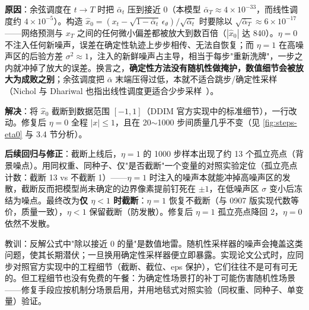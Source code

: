 \documentclass[11pt]{article}
\begin{document}
\textbf{原因}：余弦调度在 $t \to T$ 时把 $\bar{\alpha}_t$ 压到接近 0（本模型 $\bar{\alpha}_T \approx 4\times10^{-33}$，而线性调度约 $4\times10^{-5}$）。构造 $\hat{x}_0 = (x_t - \sqrt{1-\bar{\alpha}_t}\,\epsilon_\theta)/\sqrt{\bar{\alpha}_t}$ 时要除以 $\sqrt{\bar{\alpha}_T} \approx 6\times10^{-17}$——网络预测与 $x_T$ 之间的任何微小偏差都被放大到数百倍（$|\hat{x}_0|$ 达 840）。$\eta=0$ 不注入任何新噪声，误差在确定性轨迹上步步相传、无法自恢复；而 $\eta=1$ 在高噪声区的后验方差 $\sigma^2 \approx 1$，注入的新鲜噪声占主导，相当于每步"重新洗牌"，一步之内就冲掉了放大的误差。换言之，\textbf{确定性方法没有随机性做掩护，数值细节会被放大为成败之别}；余弦调度把 $\bar{\alpha}$ 末端压得过低，本就不适合跳步/确定性采样（Nichol 与 Dhariwal 也指出线性调度更适合少步采样~\parencite{nichol2021improved}）。

\textbf{解决}：将 $\hat{x}_0$ 截断到数据范围 $[-1,1]$（DDIM 官方实现中的标准细节），一行改动。修复后 $\eta=0$ 全程 $|x| \leq 1$，且在 20$\sim$1000 步间质量几乎不变（见 \ref{fig:steps-eta0} 与 3.4 节分析）。

\textbf{后续回归与修正}：截断上线后，$\eta=1$ 的 1000 步样本出现了约 13 个孤立亮点（背景噪点）。用同权重、同种子、仅"是否截断"一个变量的对照实验定位（孤立亮点计数：截断 13 vs 不截断 1）——$\eta=1$ 时注入的噪声本就能冲掉高噪声区的发散，截断反而把模型尚未确定的边界像素提前钉死在 $\pm 1$，在低噪声区 $\sigma$ 变小后冻结为噪点。最终改为\textbf{仅 $\eta<1$ 时截断}：$\eta=1$ 恢复不截断（与 0907 版实现代数等价，质量一致），$\eta<1$ 保留截断（防发散）。修复后 $\eta=1$ 孤立亮点降回 2，$\eta=0$ 依然不发散。

\begin{lightnote}
教训：反解公式中"除以接近 0 的量"是数值地雷。随机性采样器的噪声会掩盖这类问题，使其长期潜伏；一旦换用确定性采样器便立即暴露。实现论文公式时，应同步对照官方实现中的工程细节（截断、截位、eps 保护），它们往往不是可有可无的。但工程细节也没有免费的午餐：为确定性场景打的补丁可能伤害随机性场景——修复手段应按机制分场景启用，并用地毯式对照实验（同权重、同种子、单变量）验证。
\end{lightnote}

\newpage

\printbibliography[heading=bibintoc, title={References}]
\end{document}
